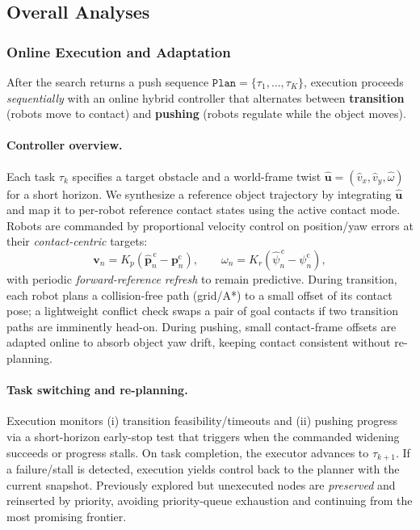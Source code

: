 \subsection{Overall Analyses}\label{subsec:overall}
\subsubsection{Online Execution and Adaptation}\label{subsec:execute}
After the search returns a push sequence $\texttt{Plan}=\{\tau_1,\ldots,\tau_K\}$,
execution proceeds \emph{sequentially} with an online hybrid controller that
alternates between \textbf{transition} (robots move to contact) and \textbf{pushing}
(robots regulate while the object moves).

\paragraph{Controller overview.}
Each task $\tau_k$ specifies a target obstacle and a world-frame twist
$\widehat{\mathbf{u}}=(\widehat{v}_x,\widehat{v}_y,\widehat{\omega})$ for a short
horizon. We synthesize a reference object trajectory by integrating
$\widehat{\mathbf{u}}$ and map it to per-robot reference contact states using the
active contact mode. Robots are commanded by proportional velocity control on
position/yaw errors at their \emph{contact-centric} targets:
\[
\mathbf{v}_n = K_{\!p}\!\left(\widehat{\mathbf{p}}^{\,\text{c}}_n - \mathbf{p}^{\text{c}}_n\right),
\qquad
\omega_n = K_{\!r}\!\left(\widehat{\psi}^{\,\text{c}}_n - \psi^{\text{c}}_n\right),
\]
with periodic \emph{forward-reference refresh} to remain predictive. During
transition, each robot plans a collision-free path (grid/A*) to a small offset of
its contact pose; a lightweight conflict check swaps a pair of goal contacts if two
transition paths are imminently head-on. During pushing, small contact-frame offsets
are adapted online to absorb object yaw drift, keeping contact consistent without
re-planning.

\paragraph{Task switching and re-planning.}
Execution monitors (i) transition feasibility/timeouts and (ii) pushing progress via
a short-horizon early-stop test that triggers when the commanded widening succeeds
or progress stalls. On task completion, the executor advances to $\tau_{k+1}$. If a
failure/stall is detected, execution yields control back to the planner with the
current snapshot. Previously explored but unexecuted nodes are \emph{preserved} and
reinserted by priority, avoiding priority-queue exhaustion and continuing from the
most promising frontier.

